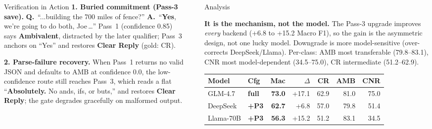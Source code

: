 \documentclass[final]{beamer}
\newlength{\sepwidth}\setlength{\sepwidth}{0.025\paperwidth}
\newlength{\halfW}\setlength{\halfW}{0.4625\paperwidth}
\newcommand{\separatorcolumn}{\begin{column}{\sepwidth}\end{column}}
\begin{document}
\begin{frame}[t]
\begin{columns}[t]
\begin{column}{\halfW}
  \begin{block}{Verification in Action}
    \textbf{1. Buried commitment (Pass-3 save).} \textbf{Q.}~``...building the 700 miles of
    fence?'' \textbf{A.}~``\textbf{Yes}, we're going to do both, Joe\,\ldots'' Pass~1 (confidence 0.85) says
    \textbf{Ambivalent}, distracted by the later qualifier; Pass~3 anchors on ``Yes'' and
    restores \textbf{Clear Reply} (gold: CR).
    \par\medskip
    \textbf{2. Parse-failure recovery.} When Pass~1 returns no valid JSON and defaults to AMB at
    confidence 0.0, the low-confidence route still reaches Pass~3, which reads a flat
    ``\textbf{Absolutely.} No ands, ifs, or buts,'' and restores \textbf{Clear Reply}; the gate
    degrades gracefully on malformed output.
  \end{block}
\end{column}
\separatorcolumn
\begin{column}{\halfW}
  \begin{block}{Analysis}
    \begin{minipage}[t]{0.53\linewidth}
      \vspace{0pt}
      \textbf{It is the mechanism, not the model.} The Pass-3 upgrade improves \emph{every}
      backend (+6.8 to +15.2 Macro F1), so the gain is the asymmetric design, not one lucky
      model. Downgrade is more model-sensitive (over-corrects DeepSeek/Llama). Per-class: AMB
      most transferable (79.8--83.1), CNR most model-dependent (34.5--75.0), CR intermediate
      (51.2--62.9).
    \end{minipage}\hfill
    \begin{minipage}[t]{0.44\linewidth}
      \vspace{0pt}\centering\fontsize{20}{23.5}\selectfont
      \setlength{\tabcolsep}{4.5pt}%
      \begin{tabular}{@{}llrrrrr@{}}
        \toprule
        \textbf{Model} & \textbf{Cfg} & \textbf{Mac} & \textbf{$\Delta$} & \textbf{CR} & \textbf{AMB} & \textbf{CNR} \\
        \midrule
        GLM-4.7 & \textbf{full} & \textbf{73.0} & \color{passThree}+17.1 & 62.9 & 81.0 & 75.0 \\
        DeepSeek & \textbf{+P3} & \textbf{62.7} & \color{passThree}+6.8 & 57.0 & 79.8 & 51.4 \\
        Llama-70B & \textbf{+P3} & \textbf{56.3} & \color{passThree}+15.2 & 51.2 & 83.1 & 34.5 \\
        \bottomrule
      \end{tabular}

\end{minipage}
\end{block}
\end{column}
\end{columns}
\end{frame}
\end{document}
